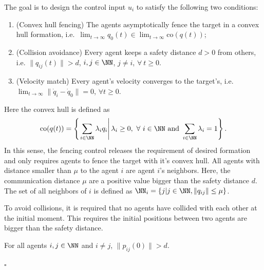 The goal is to design the control input $u_i$ to satisfy the following two conditions:
\begin{enumerate} 
\item[\textbf{P1}] (Convex hull fencing) The agents asymptotically fence the target in a convex hull formation, i.e.\ \( \lim_{t\to\infty} q_0(t)\in\lim_{t\to\infty}\mathrm{co}(q(t)) \);
	\item[\textbf{P2}] (Collision avoidance) Every agent keeps a safety distance $d > 0$ from others, i.e. $\| q_{ij}(t) \| > d$, $i, j \in \NN$, $j \neq i$, $\forall ~ t \ge 0$.
	\item[\textbf{P3}] (Velocity match) Every agent's velocity converges to the target's, i.e. $\lim_{t\to\infty} \|\dot{q}_i-\dot{q}_0\|=0$, $\forall t\geq 0$.
\end{enumerate}
\noindent Here the convex hull is defined as 
\begin{equation*}
    \mathrm{co}(q(t))=\left\{\left.
        \sum_{i\in\NN}\lambda_i q_i  \right|\lambda_i\geq 0,~\forall~ i\in\NN \textrm{ and } \sum_{i\in\NN}\lambda_i=1
    \right\}.
\end{equation*}
In this sense, the fencing control releases the requirement of desired formation and only requires agents to fence the target with it's convex hull.
All agents with distance smaller than $\mu$ to the agent $i$ are agent $i$'s neighbors.
Here, the communication distance $\mu$ are a positive value bigger than the safety distance $d$.
The set of all neighbors of $i$ is defined as $\NN_i=\left\{j|j\in\NN,\|q_{ij}\|\leq\mu\right\}$.

To avoid collisions, it is required that no agents have collided with each other at the initial moment.
This requires the initial positions between two agents are bigger than the safety distance.

\begin{assumption}	\label{assump initially_no_collision}
	For all agents $i,j \in \NN$ and $i\neq j$, $\| p_{ij}(0) \| > d$.
\end{assumption}


\hfill$\square$

